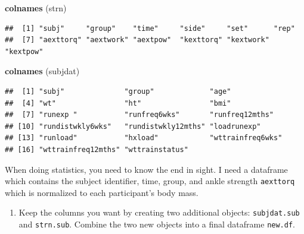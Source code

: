 \documentclass[
]{book}
\newenvironment{Shaded}{\begin{snugshade}}{\end{snugshade}}
\newcommand{\CommentTok}[1]{\textcolor[rgb]{0.56,0.35,0.01}{\textit{#1}}}
\newcommand{\DataTypeTok}[1]{\textcolor[rgb]{0.13,0.29,0.53}{#1}}
\newcommand{\KeywordTok}[1]{\textcolor[rgb]{0.13,0.29,0.53}{\textbf{#1}}}
\newcommand{\NormalTok}[1]{#1}
\newcommand{\OperatorTok}[1]{\textcolor[rgb]{0.81,0.36,0.00}{\textbf{#1}}}
\newcommand{\StringTok}[1]{\textcolor[rgb]{0.31,0.60,0.02}{#1}}
\providecommand{\tightlist}{%
  \setlength{\itemsep}{0pt}\setlength{\parskip}{0pt}}
\begin{document}
\begin{Shaded}
\begin{Highlighting}[]
\KeywordTok{colnames}\NormalTok{ (strn) }
\end{Highlighting}
\end{Shaded}

\begin{verbatim}
##  [1] "subj"     "group"    "time"     "side"     "set"      "rep"     
##  [7] "aexttorq" "aextwork" "aextpow"  "kexttorq" "kextwork" "kextpow"
\end{verbatim}

\begin{Shaded}
\begin{Highlighting}[]
\KeywordTok{colnames}\NormalTok{ (subjdat)}
\end{Highlighting}
\end{Shaded}

\begin{verbatim}
##  [1] "subj"              "group"             "age"              
##  [4] "wt"                "ht"                "bmi"              
##  [7] "runexp "           "runfreq6wks"       "runfreq12mths"    
## [10] "rundistwkly6wks"   "rundistwkly12mths" "loadrunexp"       
## [13] "runload"           "hxload"            "wttrainfreq6wks"  
## [16] "wttrainfreq12mths" "wttrainstatus"
\end{verbatim}

When doing statistics, you need to know the end in sight. I need a dataframe which contains the subject identifier, time, group, and ankle strength \texttt{aexttorq} which is normalized to each participant's body mass.

\begin{enumerate}
\def\labelenumi{\arabic{enumi}.}
\setcounter{enumi}{2}
\tightlist
\item
  Keep the columns you want by creating two additional objects: \texttt{subjdat.sub} and \texttt{strn.sub}. Combine the two new objects into a final dataframe \texttt{new.df}.
\end{enumerate}

\begin{Shaded}
\end{Shaded}
\end{document}

